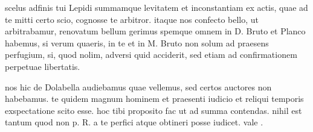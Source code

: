 


 scelus adfinis tui Lepidi summamque levitatem et inconstantiam ex actis, quae ad te mitti certo scio, cognosse te arbitror. itaque nos confecto bello, ut arbitrabamur, renovatum bellum gerimus spemque omnem in D. Bruto et Planco habemus, si verum quaeris, in te et in M. Bruto non solum ad praesens perfugium, si, quod nolim, adversi quid acciderit, sed etiam ad confirmationem perpetuae libertatis.

 nos hic de Dolabella audiebamus quae vellemus, sed certos auctores non habebamus. te quidem magnum hominem et praesenti iudicio et reliqui temporis exspectatione scito esse. hoc tibi proposito fac ut ad summa contendas. nihil est tantum quod non p. R. a te perfici atque obtineri posse iudicet. vale .
